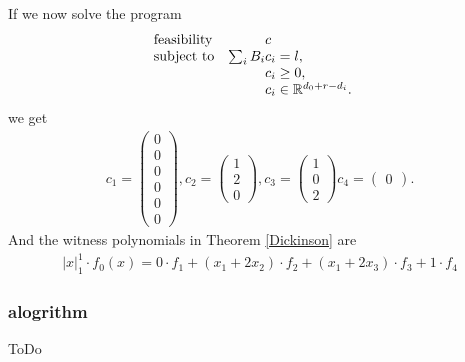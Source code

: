 \documentclass[./main.tex]{subfiles}
\begin{document}
If we now solve the program
\begin{equation*}
\begin{array}{ll@{}ll}
\text{feasibility}  & &c &\\
\text{subject to}& \sum_i B_i &c_i = l,  &\\
& &c_i \geq 0,  &\\
                 &&c_i \in \mathbb{R}^{d_0+r-d_i}.              
\end{array}
\end{equation*}
we get
\begin{align*}
c_1 = \begin{pmatrix}
0\\0\\0\\0\\0\\0
\end{pmatrix},
c_2= \begin{pmatrix}
1 \\ 2 \\ 0
\end{pmatrix},
c_3= \begin{pmatrix}
1 \\ 0 \\ 2
\end{pmatrix}
c_4= \begin{pmatrix}
0
\end{pmatrix}.
\end{align*}
And the witness polynomials in Theorem \ref{Dickinson} are
\begin{align*}
\vert x \vert_1^1 \cdot f_0(x) = 0\cdot f_1 + (x_1+2x_2)\cdot f_2 +(x_1 + 2x_3)\cdot f_3 + 1 \cdot f_4
\end{align*}
\subsubsection{alogrithm}
ToDo
\end{document}
